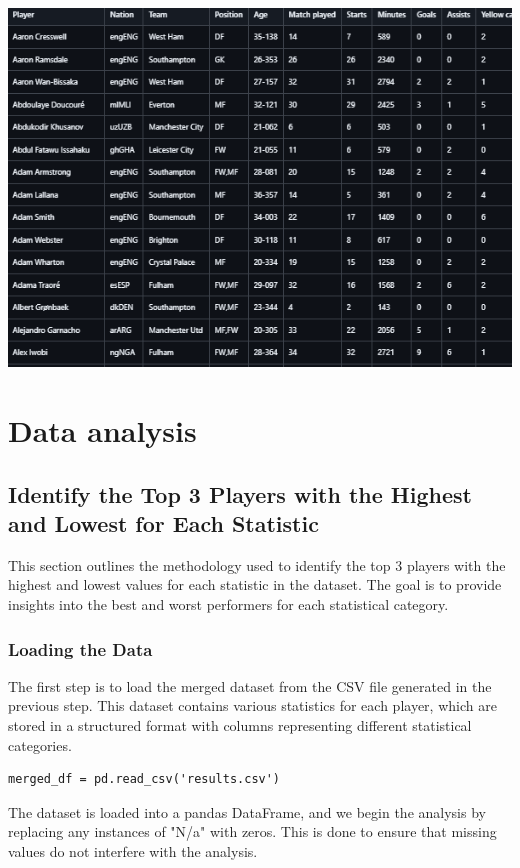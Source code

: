 \documentclass[a4paper,12pt]{article}
\begin{document}
\includegraphics{results.png}



\newpage

\section{Data analysis}

\subsection{Identify the Top 3 Players with the Highest and Lowest for Each Statistic}

This section outlines the methodology used to identify the top 3 players with the highest and lowest values for each statistic in the dataset. The goal is to provide insights into the best and worst performers for each statistical category.

\subsubsection{Loading the Data}

The first step is to load the merged dataset from the CSV file generated in the previous step. This dataset contains various statistics for each player, which are stored in a structured format with columns representing different statistical categories.

\begin{verbatim}
merged_df = pd.read_csv('results.csv')
\end{verbatim}

The dataset is loaded into a pandas DataFrame, and we begin the analysis by replacing any instances of "N/a" with zeros. This is done to ensure that missing values do not interfere with the analysis.
\end{document}
